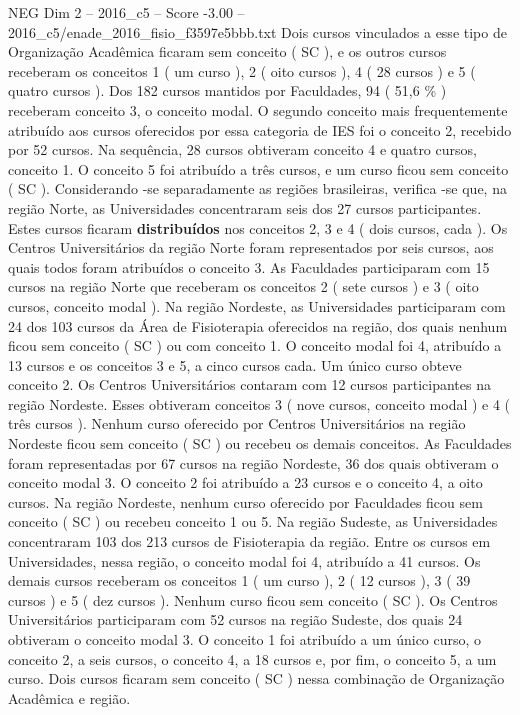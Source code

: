 \begin{textsample}{NEG Dim 2 – 2016\_c5 – Score -3.00 – 2016\_c5/enade\_2016\_fisio\_f3597e5bbb.txt}
Dois cursos vinculados a esse tipo de Organização Acadêmica ficaram sem conceito ( SC ), e os outros cursos receberam os conceitos 1 ( um curso ), 2 ( oito cursos ), 4 ( 28 cursos ) e 5 ( quatro cursos ).
Dos 182 cursos mantidos por Faculdades, 94 ( 51,6 \% ) receberam conceito 3, o conceito modal.
O segundo conceito mais frequentemente atribuído aos cursos oferecidos por essa categoria de IES foi o conceito 2, recebido por 52 cursos.
Na sequência, 28 cursos obtiveram conceito 4 e quatro cursos, conceito 1.
O conceito 5 foi atribuído a três cursos, e um curso ficou sem conceito ( SC ).
Considerando -se separadamente as regiões brasileiras, verifica -se que, na região Norte, as Universidades concentraram seis dos 27 cursos participantes.
Estes cursos ficaram \textbf{distribuídos} nos conceitos 2, 3 e 4 ( dois cursos, cada ).
Os Centros Universitários da região Norte foram representados por seis cursos, aos quais todos foram atribuídos o conceito 3.
As Faculdades participaram com 15 cursos na região Norte que receberam os conceitos 2 ( sete cursos ) e 3 ( oito cursos, conceito modal ).
Na região Nordeste, as Universidades participaram com 24 dos 103 cursos da Área de Fisioterapia oferecidos na região, dos quais nenhum ficou sem conceito ( SC ) ou com conceito 1.
O conceito modal foi 4, atribuído a 13 cursos e os conceitos 3 e 5, a cinco cursos cada.
Um único curso obteve conceito 2.
Os Centros Universitários contaram com 12 cursos participantes na região Nordeste.
Esses obtiveram conceitos 3 ( nove cursos, conceito modal ) e 4 ( três cursos ).
Nenhum curso oferecido por Centros Universitários na região Nordeste ficou sem conceito ( SC ) ou recebeu os demais conceitos.
As Faculdades foram representadas por 67 cursos na região Nordeste, 36 dos quais obtiveram o conceito modal 3.
O conceito 2 foi atribuído a 23 cursos e o conceito 4, a oito cursos.
Na região Nordeste, nenhum curso oferecido por Faculdades ficou sem conceito ( SC ) ou recebeu conceito 1 ou 5.
Na região Sudeste, as Universidades concentraram 103 dos 213 cursos de Fisioterapia da região.
Entre os cursos em Universidades, nessa região, o conceito modal foi 4, atribuído a 41 cursos.
Os demais cursos receberam os conceitos 1 ( um curso ), 2 ( 12 cursos ), 3 ( 39 cursos ) e 5 ( dez cursos ).
Nenhum curso ficou sem conceito ( SC ).
Os Centros Universitários participaram com 52 cursos na região Sudeste, dos quais 24 obtiveram o conceito modal 3.
O conceito 1 foi atribuído a um único curso, o conceito 2, a seis cursos, o conceito 4, a 18 cursos e, por fim, o conceito 5, a um curso.
Dois cursos ficaram sem conceito ( SC ) nessa combinação de Organização Acadêmica e região.

\end{textsample}
